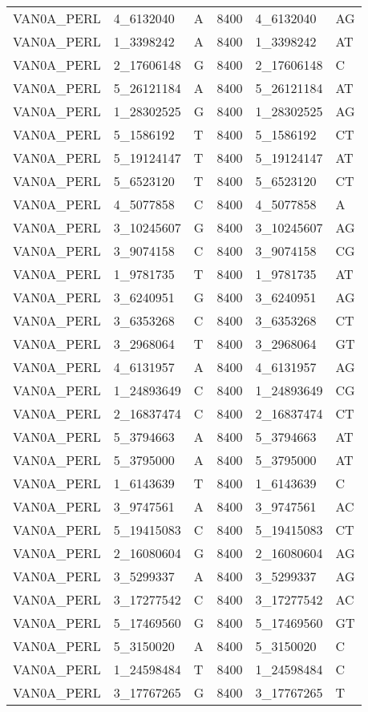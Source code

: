 \begin{center}
\begin{longtable}{|l|l|l|l|l|l|}
VAN0A\_PERL&4\_6132040&A&8400&4\_6132040&AG\\
VAN0A\_PERL&1\_3398242&A&8400&1\_3398242&AT\\
VAN0A\_PERL&2\_17606148&G&8400&2\_17606148&C\\
VAN0A\_PERL&5\_26121184&A&8400&5\_26121184&AT\\
VAN0A\_PERL&1\_28302525&G&8400&1\_28302525&AG\\
VAN0A\_PERL&5\_1586192&T&8400&5\_1586192&CT\\
VAN0A\_PERL&5\_19124147&T&8400&5\_19124147&AT\\
VAN0A\_PERL&5\_6523120&T&8400&5\_6523120&CT\\
VAN0A\_PERL&4\_5077858&C&8400&4\_5077858&A\\
VAN0A\_PERL&3\_10245607&G&8400&3\_10245607&AG\\
VAN0A\_PERL&3\_9074158&C&8400&3\_9074158&CG\\
VAN0A\_PERL&1\_9781735&T&8400&1\_9781735&AT\\
VAN0A\_PERL&3\_6240951&G&8400&3\_6240951&AG\\
VAN0A\_PERL&3\_6353268&C&8400&3\_6353268&CT\\
VAN0A\_PERL&3\_2968064&T&8400&3\_2968064&GT\\
VAN0A\_PERL&4\_6131957&A&8400&4\_6131957&AG\\
VAN0A\_PERL&1\_24893649&C&8400&1\_24893649&CG\\
VAN0A\_PERL&2\_16837474&C&8400&2\_16837474&CT\\
VAN0A\_PERL&5\_3794663&A&8400&5\_3794663&AT\\
VAN0A\_PERL&5\_3795000&A&8400&5\_3795000&AT\\
VAN0A\_PERL&1\_6143639&T&8400&1\_6143639&C\\
VAN0A\_PERL&3\_9747561&A&8400&3\_9747561&AC\\
VAN0A\_PERL&5\_19415083&C&8400&5\_19415083&CT\\
VAN0A\_PERL&2\_16080604&G&8400&2\_16080604&AG\\
VAN0A\_PERL&3\_5299337&A&8400&3\_5299337&AG\\
VAN0A\_PERL&3\_17277542&C&8400&3\_17277542&AC\\
VAN0A\_PERL&5\_17469560&G&8400&5\_17469560&GT\\
VAN0A\_PERL&5\_3150020&A&8400&5\_3150020&C\\
VAN0A\_PERL&1\_24598484&T&8400&1\_24598484&C\\
VAN0A\_PERL&3\_17767265&G&8400&3\_17767265&T\\

\end{longtable}
\end{center}
